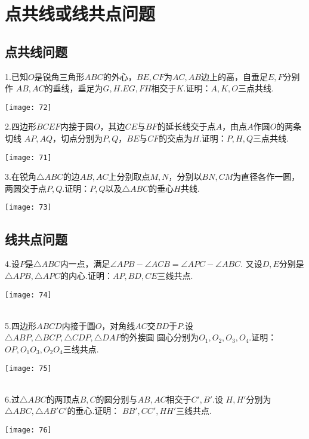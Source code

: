 \section{点共线或线共点问题}
\subsection{点共线问题}

1.已知$O$是锐角三角形$ABC$的外心，$BE,CF$为$AC,AB$边上的高，自垂足$E,F$分别作
$AB,AC$的垂线，垂足为$G,H$.$EG,FH$相交于$K$.证明：$A,K,O$三点共线.
\begin{flushleft}
    \texttt{[image: 72]}
\end{flushleft}

2.四边形$BCEF$内接于圆$O$，其边$CE$与$BF$的延长线交于点$A$，由点$A$作圆$O$的两条切线
$AP,AQ$，切点分别为$P,Q$，$BE$与$CF$的交点为$H$.证明：$P,H,Q$三点共线.
\begin{flushleft}
    \texttt{[image: 71]}
\end{flushleft}

3.在锐角$\bigtriangleup ABC$的边$AB,AC$上分别取点$M,N$，分别以$BN,CM$为直径各作一圆，
两圆交于点$P,Q$.证明：$P,Q$以及$\bigtriangleup ABC$的垂心$H$共线.
\begin{flushleft}
    \texttt{[image: 73]}
\end{flushleft}

\newpage

\subsection{线共点问题}
4.设$P$是$\bigtriangleup ABC$内一点，满足$\angle APB-\angle ACB=\angle APC-\angle ABC$.
又设$D,E$分别是$\bigtriangleup APB,\bigtriangleup APC$的内心.证明：$AP,BD,CE$三线共点.
\begin{flushleft}
    \texttt{[image: 74]}
\end{flushleft}
~\\

5.四边形$ABCD$内接于圆$O$，对角线$AC$交$BD$于$P$.设$\bigtriangleup ABP,\bigtriangleup BCP,\bigtriangleup CDP,\bigtriangleup DAP$的外接圆
圆心分别为$O_1,O_2,O_3,O_4$.证明：$OP,O_1O_3,O_2O_4$三线共点.
\begin{flushleft}
    \texttt{[image: 75]}
\end{flushleft}
~\\

6.过$\bigtriangleup ABC$的两顶点$B,C$的圆分别与$AB,AC$相交于$C',B'$.设
$H,H'$分别为$\bigtriangleup ABC,\bigtriangleup AB'C'$的垂心.证明：
$BB',CC',HH'$三线共点.
\begin{flushleft}
    \texttt{[image: 76]}
\end{flushleft}

